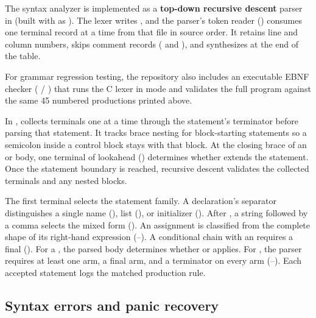 The syntax analyzer is implemented as a \textbf{top-down recursive descent} parser in  (built with  as ). The lexer writes , and the parser's token reader () consumes one terminal record at a time from that file in source order. It retains line and column numbers, skips comment records ( and ), and synthesizes  at the end of the table.

For grammar regression testing, the repository also includes an executable EBNF checker ( / ) that runs the C lexer in  mode and validates the full program against the same 45 numbered productions printed above.

In ,  collects terminals one at a time through the statement's terminator before parsing that statement. It tracks brace nesting for block-starting statements so a semicolon inside a control block stays with that block. At the closing brace of an  or  body, one terminal of lookahead () determines whether  extends the statement. Once the statement boundary is reached, recursive descent validates the collected terminals and any nested blocks.

The first terminal selects the statement family. A declaration's separator distinguishes a single name (), list (), or initializer (). After , a string followed by a comma selects the mixed form (). An assignment is classified from the complete shape of its right-hand expression (--). A conditional chain with an  requires a final  (). For a , the parsed body determines whether  or  applies. For , the parser requires at least one  arm, a final  arm, and a  terminator on every arm (--). Each accepted statement logs the matched production rule.

\subsection{Syntax errors and panic recovery}

